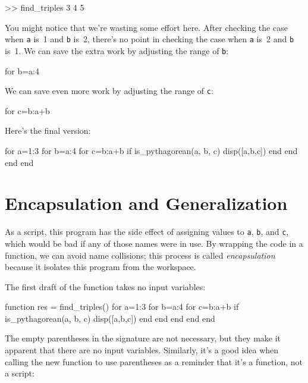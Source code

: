 \begin{code}
>> find_triples
     3     4     5
\end{code}

You might notice that we're wasting some effort here.
After checking the case when \lstinline{a} is~1 and \lstinline{b} is~2, there's no point in checking
the case when \lstinline{a} is~2 and \lstinline{b} is~1.  We can save the extra work by adjusting the
range of \lstinline{b}:

\begin{code}
for b=a:4
\end{code}

We can save even more work by adjusting the range of \lstinline{c}:

\begin{code}
for c=b:a+b
\end{code}

Here's the final version:

\begin{code}
for a=1:3
    for b=a:4
        for c=b:a+b
            if is_pythagorean(a, b, c)
                disp([a,b,c])
            end
        end
    end
end
\end{code}

\section{Encapsulation and Generalization}

As a script, this program has the side effect of assigning values to
\lstinline{a}, \lstinline{b}, and \lstinline{c}, which would be bad if any of those names were in use.
By wrapping the code in a function, we can avoid name collisions; this process is called \emph{encapsulation} because it isolates this program from the workspace.


The first draft of the function takes no input variables:

\begin{code}
function res = find_triples()
    for a=1:3
        for b=a:4
            for c=b:a+b
                if is_pythagorean(a, b, c)
                    disp([a,b,c])
                end
            end
        end
    end
end
\end{code}

The empty parentheses in the signature are not necessary, but
they make it apparent that there are no input variables.  Similarly,
it's a good  idea when calling the new function to use parentheses as a reminder
that it's a function, not a script:

